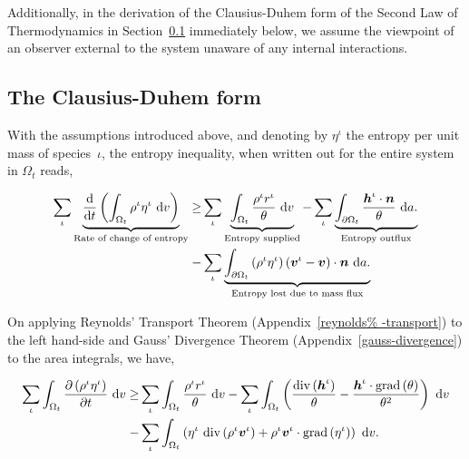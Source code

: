 \noindent Additionally, in the derivation of the Clausius-Duhem form
of the Second Law of Thermodynamics in
Section~\ref{eu-clausius-duhem-form} immediately below, we assume the
viewpoint of an observer external to the system unaware of any
internal interactions.

\subsection{The Clausius-Duhem form}
\label{eu-clausius-duhem-form}

With the assumptions introduced above, and denoting by $\eta^\iota$
the entropy per unit mass of species~$\iota$, the entropy inequality,
when written out for the entire system in $\Omega_{t}$ reads,

\begin{equation}
\begin{split}
\sum\limits_{\iota}
\underbrace{\frac{\mathrm{d}}{\mathrm{d}t}\left(\int_{\Omega_{t}}
  \rho^{\iota} \eta^{\iota}\ \mathrm{d}v \right)}_{\text{Rate of
    change of entropy}} \geq & \sum\limits_{\iota}
\underbrace{\int_{\Omega_{t}} \frac{ \rho^{\iota}
    r^{\iota}}{\theta}\ \mathrm{d}v}_{\text{Entropy supplied}} -
\sum\limits_{\iota} \underbrace{\int_{\partial \Omega_{t}}
  \frac{\mbox{\boldmath$ h$}^{\iota}\cdot\mbox{\boldmath$ n$}}{\theta}\ \mathrm{d}a.}_{\text{Entropy
    outflux}} \\ - & \sum\limits_{\iota} \underbrace{\int_{\partial
    \Omega_{t}} \left(\rho^{\iota} \eta^{\iota} \right)
  \left(\mbox{\boldmath$ v$}^{\iota} - \mbox{\boldmath$ v$}\right) \cdot
  \mbox{\boldmath$ n$}\ \mathrm{d}a.}_{\text{Entropy lost due to mass flux}}
\end{split}
\label{eu-globalbalanceofentropy}
\end{equation}

On applying Reynolds' Transport Theorem (Appendix~\ref{reynolds%
  -transport}) to the left hand-side and Gauss' Divergence Theorem
(Appendix~\ref{gauss-divergence}) to the area integrals, we have,

\begin{equation*}
\begin{split}
\sum\limits_{\iota} \int_{\Omega_{t}} \frac{\partial
  \left(\rho^{\iota} \eta^{\iota}\right) }{\partial t} \ \mathrm{d}v
\geq & \sum\limits_{\iota} \int_{\Omega_{t}} \frac{ \rho^{\iota}
  r^{\iota}}{\theta}\ \mathrm{d}v - \sum\limits_{\iota}
\int_{\Omega_{t}} \left(
\frac{\mathrm{div}\left(\mbox{\boldmath$ h$}^{\iota}\right)}{\theta} -
\frac{\mbox{\boldmath$ h$}^{\iota}\cdot\mathrm{grad}\left(\theta\right)}{\theta^{2}}
\right)\ \mathrm{d}v \\ - & \sum\limits_{\iota} \int_{\Omega_{t}}
\left( \eta^{\iota}\ \mathrm{div} \left(\rho^{\iota}\mbox{\boldmath$ v$}^{\iota}
\right) +
\rho^{\iota}\mbox{\boldmath$ v$}^{\iota}\cdot\mathrm{grad}\left(\eta^{\iota}\right)
\right)\ \mathrm{d}v.
\end{split}
\end{equation*}

